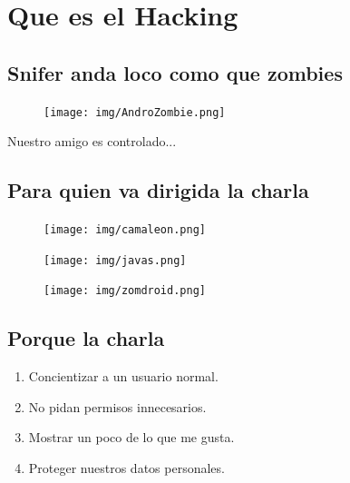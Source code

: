 \documentclass[12pt]{beamer} %
\begin{document}
\section{Que es el Hacking}

\subsection{Snifer anda loco como que zombies}

\begin{slide}
    \begin{figure}[h]
      \texttt{[image: img/AndroZombie.png]}
    \end{figure}
    Nuestro amigo es controlado...
\end{slide}

\subsection{Para quien va dirigida la charla}
\begin{slide}
 
  \begin{figure}[h]
      \texttt{[image: img/camaleon.png]}
  \end{figure}
\end{slide}

\begin{slide}
  \begin{figure}[h]
      \texttt{[image: img/javas.png]}
    \end{figure}
\end{slide}


\begin{slide}
  \begin{figure}[h]
      \texttt{[image: img/zomdroid.png]}
    \end{figure}
\end{slide}
\subsection{Porque la charla}
\begin{slide}
 
  \begin{enumerate}
    \item Concientizar a un usuario normal.\pause
    \item No pidan permisos innecesarios.\pause
    \item Mostrar un poco de lo que me gusta.\pause
    \item Proteger nuestros datos personales.
  \end{enumerate}
\end{slide}
\end{document}
